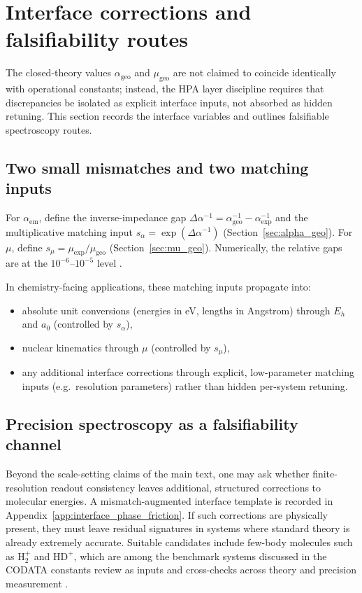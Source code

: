 \section{Interface corrections and falsifiability routes}
\label{sec:falsifiability}

The closed-theory values $\alpha_{\mathrm{geo}}$ and $\mu_{\mathrm{geo}}$ are not claimed to coincide identically with operational constants; instead, the HPA layer discipline requires that discrepancies be isolated as explicit interface inputs, not absorbed as hidden retuning. This section records the interface variables and outlines falsifiable spectroscopy routes.

\subsection{Two small mismatches and two matching inputs}
For $\alpha_{\mathrm{em}}$, define the inverse-impedance gap $\Delta\alpha^{-1}=\alpha_{\mathrm{geo}}^{-1}-\alpha_{\mathrm{exp}}^{-1}$ and the multiplicative matching input $s_\alpha=\exp(\Delta\alpha^{-1})$ (Section~\ref{sec:alpha_geo}). For $\mu$, define $s_\mu=\mu_{\mathrm{exp}}/\mu_{\mathrm{geo}}$ (Section~\ref{sec:mu_geo}). Numerically, the relative gaps are at the $10^{-6}$--$10^{-5}$ level \cite{Ma2025PCG,CODATA2022RMP}.

In chemistry-facing applications, these matching inputs propagate into:
\begin{itemize}
\item absolute unit conversions (energies in eV, lengths in Angstrom) through $E_h$ and $a_0$ (controlled by $s_\alpha$),
\item nuclear kinematics through $\mu$ (controlled by $s_\mu$),
\item any additional interface corrections through explicit, low-parameter matching inputs (e.g.\ resolution parameters) rather than hidden per-system retuning.
\end{itemize}

\subsection{Precision spectroscopy as a falsifiability channel}
Beyond the scale-setting claims of the main text, one may ask whether finite-resolution readout consistency leaves additional, structured corrections to molecular energies. A mismatch-augmented interface template is recorded in Appendix~\ref{app:interface_phase_friction}. If such corrections are physically present, they must leave residual signatures in systems where standard theory is already extremely accurate. Suitable candidates include few-body molecules such as $\mathrm{H}_2^+$ and $\mathrm{HD}^+$, which are among the benchmark systems discussed in the CODATA constants review as inputs and cross-checks across theory and precision measurement \cite{CODATA2022RMP}.

